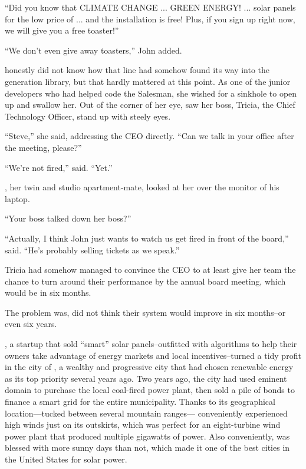 ``Did you know that CLIMATE CHANGE ... GREEN ENERGY! ... solar panels for the low price of ... and the installation is free! Plus, if you sign up right now, we will give you a free toaster!''

``We don't even give away toasters,'' John added.

{\protag} honestly did not know how that line had somehow found its way into the generation library, but that hardly mattered at this point. As one of the junior developers who had helped code the Salesman, she wished for a sinkhole to open up and swallow her. Out of the corner of her eye, {\protag} saw her boss, Tricia, the Chief Technology Officer, stand up with steely eyes.

``Steve,'' she said, addressing the CEO directly. ``Can we talk in your office after the meeting, please?''

\bigbreak

``We're not fired,'' {\protag} said. ``Yet.''

{\sidetag}, her twin and studio apartment-mate, looked at her over the monitor of his laptop.

``Your boss talked down her boss?''

``Actually, I think John just wants to watch us get fired in front of the board,'' {\protag} said. ``He's probably selling tickets as we speak.''

Tricia had somehow managed to convince the CEO to at least give her team the chance to turn around their performance by the annual board meeting, which would be in six months.

The problem was, {\protag} did not think their system would improve in six months--or even six years. 

 {\energyCompany}, a startup that sold ``smart'' solar panels--outfitted with algorithms to help their owners take advantage of energy markets and local incentives--turned a tidy profit in the city of {\crunchyCity}, a wealthy and progressive city that had chosen renewable energy as its top priority several years ago. Two years ago, the city had used eminent domain to purchase the local coal-fired power plant, then sold a pile of bonds to finance a smart grid for the entire municipality. Thanks to its geographical location---tucked between several mountain ranges---\crunchyCity{} conveniently experienced high winds just on its outskirts, which was perfect for an eight-turbine wind power plant that produced multiple gigawatts of power. Also conveniently, \crunchyCity{} was blessed with more sunny days than not, which made it one of the best cities in the United States for solar power.

